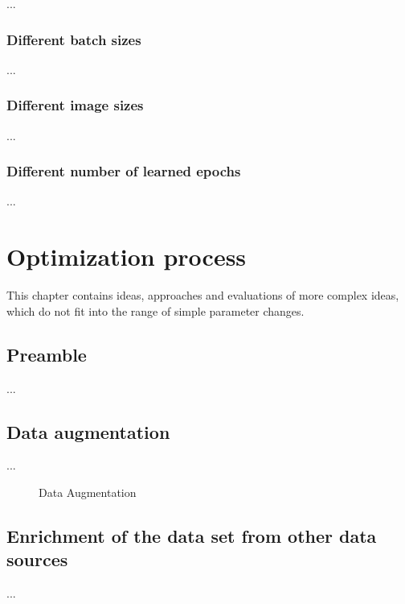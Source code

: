 \documentclass[10pt]{article}
\newcommand\inputpgf[2]{{
\let\pgfimageWithoutPath\pgfimage
\renewcommand{\pgfimage}[2][]{\pgfimageWithoutPath[##1]{#1/##2}}

}}
\begin{document}
				\noindent ...
		
			\subsubsection{Different batch sizes}
	
				\noindent ...
		
			\subsubsection{Different image sizes}
	
				\noindent ...
		
			\subsubsection{Different number of learned epochs}
	
				\noindent ...


	
	\section{Optimization process}
		This chapter contains ideas, approaches and evaluations of more complex ideas, which do not fit into the range of simple parameter changes.
	
		\subsection{Preamble}
			\noindent ...

		\subsection{Data augmentation}
			\noindent ...

			\begin{figure}[H]
				\begin{center}
					\inputpgf{images/pgf}{augment.pgf}
				\end{center}
				\caption{Data Augmentation}
				\label{fig:data_augmentation}
			\end{figure}

		\subsection{Enrichment of the data set from other data sources}
			\noindent ...
		
\end{document}
